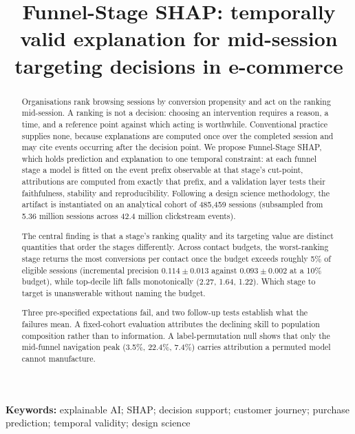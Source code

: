 \documentclass[a4paper]{article}
\begin{document}
\title{\vspace{-2em}Funnel-Stage SHAP: temporally valid explanation for
       mid-session targeting decisions in e-commerce}
\date{}
\author{}
\maketitle
\vspace{-3em}

\begin{abstract}
\singlespacing
Organisations rank browsing sessions by conversion propensity and act on the
ranking mid-session. A ranking is not a decision: choosing an intervention
requires a reason, a time, and a reference point against which acting is
worthwhile. Conventional practice supplies none, because explanations are
computed once over the completed session and may cite events occurring after
the decision point. We propose Funnel-Stage SHAP, which holds
prediction and explanation to one temporal constraint: at each funnel stage a
model is fitted on the event prefix observable at that stage's cut-point,
attributions are computed from exactly that prefix, and a validation layer
tests their faithfulness, stability and reproducibility. Following a design
science methodology, the artifact is instantiated on an analytical cohort of
485,459 sessions (subsampled from 5.36 million sessions across 42.4 million clickstream events).

The central finding is that a stage's ranking quality and its targeting value
are distinct quantities that order the stages differently. Across contact
budgets, the worst-ranking stage returns the most conversions per contact once
the budget exceeds roughly 5\% of eligible sessions (incremental precision
$0.114 \pm 0.013$ against $0.093 \pm 0.002$ at a 10\% budget), while
top-decile lift falls monotonically (2.27, 1.64, 1.22). Which stage to target
is unanswerable without naming the budget.

Three pre-specified expectations fail, and two follow-up tests establish what
the failures mean. A fixed-cohort evaluation attributes the declining skill to
population composition rather than to information. A label-permutation null
shows that only the mid-funnel navigation peak (3.5\%, 22.4\%, 7.4\%) carries
attribution a permuted model cannot manufacture.
\end{abstract}

\noindent\textbf{Keywords:} explainable AI; SHAP; decision support;
customer journey; purchase prediction; temporal validity; design science
\end{document}
